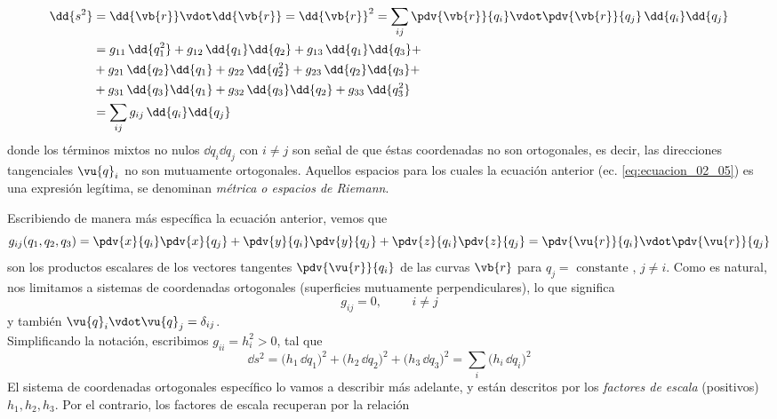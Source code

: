 \begin{align}
\dd{s^{2}} &= \dd{\vb{r}} \vdot \dd{\vb{r}} =  \dd{\vb{r}}^{2} =  \sum_{ij} \pdv{\vb{r}}{q_{i}} \vdot \pdv{\vb{r}}{q_{j}} \, \dd{q_{i}} \dd{q_{j}} \nonumber \\
&= g_{11} \, \dd{q_{1}^{2}} + g_{12} \, \dd{q_{1}} \dd{q_{2}} + g_{13} \, \dd{q_{1}} \dd{q_{3}} + \nonumber \\
&+ g_{21} \, \dd{q_{2}} \dd{q_{1}} + g_{22} \, \dd{q_{2}^{2}} + g_{23} \, \dd{q_{2}} \dd{q_{3}} + \nonumber \\
&+ g_{31} \, \dd{q_{3}} \dd{q_{1}} + g_{32} \, \dd{q_{3}} \dd{q_{2}} + g_{33} \, \dd{q_{3}^{2}} \nonumber \\
&= \sum_{ij} g_{ij} \, \dd{q_{i}} \dd{q_{j}}
\label{eq:ecuacion_02_05}
\end{align}
donde los términos mixtos no nulos $\dd{q_{i}} \dd{q_{j}}$ con $i \neq j$ son señal de que éstas coordenadas no son ortogonales, es decir, las direcciones tangenciales $\vu{q}_{i}$ no son mutuamente ortogonales. Aquellos espacios para los cuales la ecuación anterior (ec. \ref{eq:ecuacion_02_05}) es una expresión legítima, se denominan \emph{métrica o espacios de Riemann}.
\par
Escribiendo de manera más específica la ecuación anterior, vemos que
\begin{equation}
g_{ij}(q_{1}, q_{2}, q_{3}) = \pdv{x}{q_{i}} \pdv{x}{q_{j}} + \pdv{y}{q_{i}} \pdv{y}{q_{j}} + \pdv{ z}{q_{i}} \pdv{z}{q_{j}} = \pdv{\vu{r}}{q_{i}} \vdot \pdv{\vu{r}}{q_{j}}
\label{eq:ecuacion_02_06}
\end{equation}
son los productos escalares de los vectores tangentes $\pdv{\vu{r}}{q_{i}}$ de las curvas $\vb{r}$ para $q_{j} = \mbox{ constante}$ , $j \neq i$. Como es natural, nos limitamos a  sistemas de coordenadas ortogonales (superficies mutuamente perpendiculares), lo que significa
\begin{equation}
g_{ij} = 0, \hspace{1cm} i \neq j
\label{eq:ecuacion_02_07}
\end{equation}
y también $\vu{q}_{i} \vdot \vu{q}_{j} = \delta_{ij}$.
\\
Simplificando la notación, escribimos $g_{ii} = h_{i}^{2} > 0$, tal que
\begin{equation}
\dd{s^{2}} = (h_{1} \, \dd{q_{1})^{2}} + (h_{2} \, \dd{q_{2})^{2}} + (h_{3} \, \dd{q_{3})^{2}} = \sum_{i} (h_{i} \, \dd{q_{i})^{2}} 
\label{eq:ecuacion_02_08}
\end{equation}
El sistema de coordenadas ortogonales específico lo vamos a describir más adelante, y están descritos por los \emph{factores de escala} (positivos) $h_{1}, h_{2}, h_{3}$. Por el contrario, los factores de escala recuperan por la relación
